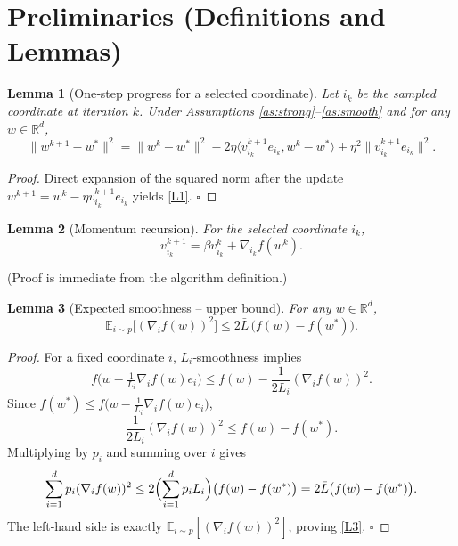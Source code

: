 \documentclass{article}
\newtheorem{lemma}{Lemma}
\newcommand{\E}{\mathbb{E}}
\newcommand{\R}{\mathbb{R}}
\begin{document}
\section*{Preliminaries (Definitions and Lemmas)}
\begin{lemma}[One‑step progress for a selected coordinate]\label{lem:one}
Let $i_k$ be the sampled coordinate at iteration $k$. Under
Assumptions \ref{as:strong}–\ref{as:smooth} and for any $w\in\R^{d}$,
\[
\|w^{k+1}-w^{*}\|^{2}
= \|w^{k}-w^{*}\|^{2}
-2\eta\langle v_{i_k}^{k+1}e_{i_k},w^{k}-w^{*}\rangle
+\eta^{2}\|v_{i_k}^{k+1}e_{i_k}\|^{2}.
\tag{L1}
\]
\end{lemma}
\begin{proof}
Direct expansion of the squared norm after the update
$w^{k+1}=w^{k}-\eta v_{i_k}^{k+1}e_{i_k}$ yields \eqref{L1}. $\square$
\end{proof}

\begin{lemma}[Momentum recursion]\label{lem:momentum}
For the selected coordinate $i_k$,
\[
v_{i_k}^{k+1}= \beta v_{i_k}^{k}+ \nabla_{i_k} f(w^{k}).
\tag{L2}
\]
\end{lemma}
(Proof is immediate from the algorithm definition.)

\begin{lemma}[Expected smoothness – upper bound]\label{lem:exp-smooth}
For any $w\in\R^{d}$,
\[
\E_{i\sim p}\!\bigl[(\nabla_i f(w))^{2}\bigr]\le 2\bar L\,
\bigl(f(w)-f(w^{*})\bigr).
\tag{L3}
\]
\end{lemma}
\begin{proof}
For a fixed coordinate $i$, $L_i$‑smoothness implies
\[
f\bigl(w-\tfrac{1}{L_i}\nabla_i f(w)e_i\bigr)
\le f(w)-\frac{1}{2L_i}(\nabla_i f(w))^{2}.
\]
Since $f(w^{*})\le f\bigl(w-\tfrac{1}{L_i}\nabla_i f(w)e_i\bigr)$,
\[
\frac{1}{2L_i}(\nabla_i f(w))^{2}
\le f(w)-f(w^{*}).
\]
Multiplying by $p_i$ and summing over $i$ gives
\[
\sum_{i=1}^{d}p_i(\nabla_i f(w))^{2}
\le 2\Bigl(\sum_{i=1}^{d}p_i L_i\Bigr)\bigl(f(w)-f(w^{*})\bigr)
=2\bar L\bigl(f(w)-f(w^{*})\bigr).
\]
The left‑hand side is exactly $\E_{i\sim p}[(\nabla_i f(w))^{2}]$, proving \eqref{L3}. $\square$
\end{proof}
\end{document}
